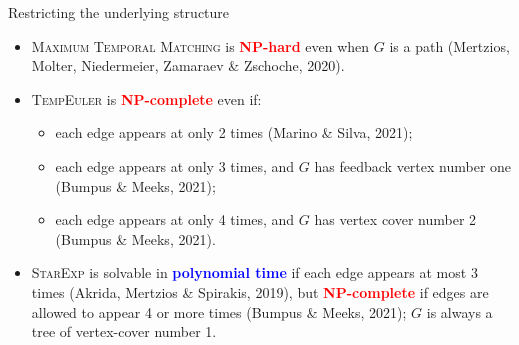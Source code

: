 \documentclass[10pt, compress]{beamer}
\begin{document}
\begin{frame}{Restricting the underlying structure}

\begin{itemize}
\item \textsc{Maximum Temporal Matching} is \textbf{\textcolor{red}{NP-hard}} even when $G$ is a path (Mertzios, Molter, Niedermeier, Zamaraev \& Zschoche, 2020).
\item \textsc{TempEuler} is \textbf{\textcolor{red}{NP-complete}} even if:
\begin{itemize}
\item each edge appears at only 2 times (Marino \& Silva, 2021);
\item each edge appears at only 3 times, and $G$ has feedback vertex number one (Bumpus \& Meeks, 2021);
\item each edge appears at only 4 times, and $G$ has vertex cover number 2 (Bumpus \& Meeks, 2021). 
\end{itemize}
\item \textsc{StarExp} is solvable in \textbf{\textcolor{blue}{polynomial time}} if each edge appears at most 3 times (Akrida, Mertzios \& Spirakis, 2019), but \textbf{\textcolor{red}{NP-complete}}  if edges are allowed to appear 4 or more times (Bumpus \& Meeks, 2021); $G$ is always a tree of vertex-cover number 1.
\end{itemize}
\end{frame}
\end{document}
